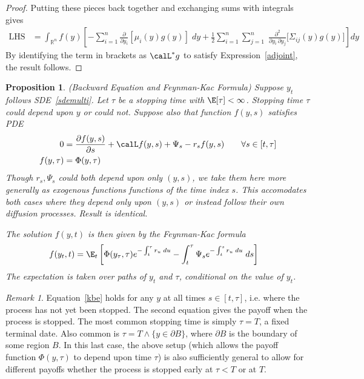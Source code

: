 \documentclass[12pt]{article}
\theoremstyle{plain}
\newtheorem{prop}[thm]{Proposition}
\theoremstyle{definition}
\theoremstyle{remark}
\newtheorem*{rmk}{Remark}
\newcommand{\Rn}{\mathbb{R}^n}
\newcommand{\sumin}{\sum^n_{i=1}}
\newcommand{\sumjn}{\sum^n_{j=1}}
\begin{document}
\begin{proof}
Putting these pieces back together and exchanging sums with integrals
gives
\begin{align*}
  \text{LHS}
  &=
  \int_{\Rn}
  f(y)
  \left[
  -
  \sumin
  \frac{\partial}{\partial y_i}
  \left[
  \mu_i(y)
  g(y)
  \right]
  \;dy
  +
  \frac{1}{2}
  \sumin
  \sumjn
  \;
  \frac{\partial^2 }{\partial y_i\,\partial y_j}
  \big[
  \Sigma_{ij}(y)
  g(y)
  \big]
  \right]
  dy
\end{align*}
By identifying the term in brackets as $\calL^*g$ to satisfy
Expression~\ref{adjoint}, the result follows.
\end{proof}

\clearpage
\begin{prop}\emph{(Backward Equation and Feynman-Kac Formula)}
Suppose $y_t$ follows SDE~\ref{sdemulti}.
Let $\tau$ be a stopping time with $\E[\tau]<\infty$. Stopping time
$\tau$ could depend upon $y$ or could not.
Suppose also that function $f(y,s)$ satisfies PDE
\begin{align}
  0
  &=
  \frac{\partial  f(y,s)}{\partial s}
  + \calL f(y,s)
  + \Psi_s
  - r_sf(y,s)
  \qquad
  \forall s\in[t,\tau]
  \label{kbe}
  \\
  f(y,\tau)
  &=
  \Phi(y,\tau)
  \label{kbeterm}
\end{align}
Though $r_s,\Psi_s$ could both depend upon only $(y,s)$, we take
them here more generally as exogenous functions functions of the time
index $s$.
This accomodates both cases where they depend only upon $(y,s)$ or
instead follow their own diffusion processes. Result is identical.

The solution $f(y,t)$ is then given by the Feynman-Kac formula
\begin{align*}
  f(y_t,t)
  &=
  \E_t\left[
    \Phi(y_\tau,\tau)
    e^{-\int_t^\tau r_u\;du}
    -
    \int_t^\tau
    \Psi_s
    e^{-\int_t^sr_u\;du}
    \;
    ds
  \right]
\end{align*}
The expectation is taken over paths of $y_t$ and $\tau$, conditional on
the value of $y_t$.
\end{prop}
\begin{rmk}
Equation~\ref{kbe} holds for any $y$ at all times $s\in[t,\tau]$, i.e.
where the process has not yet been stopped. The second equation gives
the payoff when the process is stopped. The most common stopping time
is simply $\tau=T$, a fixed terminal date. Also common is $\tau=T\wedge
\{y\in\partial B\}$, where $\partial B$ is the boundary of some region
$B$.  In this last case, the above setup (which allows the payoff
function $\Phi(y,\tau)$ to depend upon time $\tau$) is also sufficiently
general to allow for different payoffs whether the process is stopped
early at $\tau<T$ or at $T$.
\end{rmk}
\end{document}
